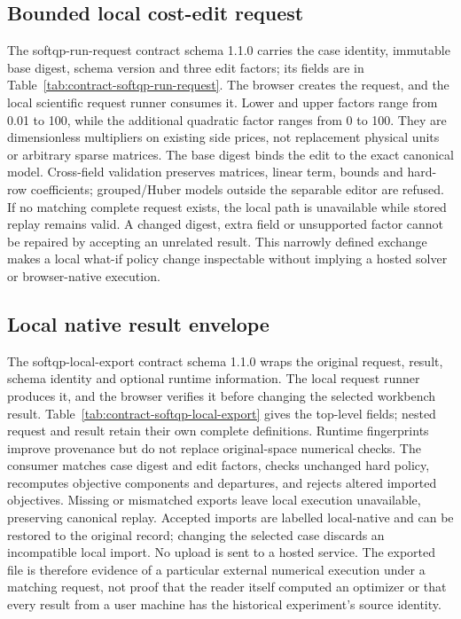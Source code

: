 \subsection{Bounded local cost-edit request}\label{sec:contract-softqp-run-request}
The softqp-run-request contract schema 1.1.0 carries the case identity, immutable
base digest, schema version and three edit factors; its fields are in
Table~\ref{tab:contract-softqp-run-request}. The browser creates the request,
and the local scientific request runner consumes it. Lower and upper factors
range from 0.01 to 100, while the additional quadratic factor ranges from 0 to 100.
They are dimensionless multipliers on existing side prices, not replacement
physical units or arbitrary sparse matrices. The base digest binds the edit
to the exact canonical model. Cross-field validation preserves matrices,
linear term, bounds and hard-row coefficients; grouped/Huber models outside
the separable editor are refused. If no matching complete request exists,
the local path is unavailable while stored replay remains valid. A changed
digest, extra field or unsupported factor cannot be repaired by accepting an
unrelated result. This narrowly defined exchange makes a local what-if policy
change inspectable without implying a hosted solver or browser-native execution.


\subsection{Local native result envelope}\label{sec:contract-softqp-local-export}
The softqp-local-export contract schema 1.1.0 wraps the original request,
result, schema identity and optional runtime information. The local request
runner produces it, and the browser verifies it before changing the selected
workbench result. Table~\ref{tab:contract-softqp-local-export} gives the top-level
fields; nested request and result retain their own complete definitions.
Runtime fingerprints improve provenance but do not replace original-space
numerical checks. The consumer matches case digest and edit factors, checks
unchanged hard policy, recomputes objective components and departures, and
rejects altered imported objectives. Missing or mismatched exports leave
local execution unavailable, preserving canonical replay. Accepted imports
are labelled local-native and can be restored to the original record; changing
the selected case discards an incompatible local import. No upload is sent
to a hosted service. The exported file is therefore evidence of a particular
external numerical execution under a matching request, not proof that the
reader itself computed an optimizer or that every result from a user machine
has the historical experiment's source identity.


